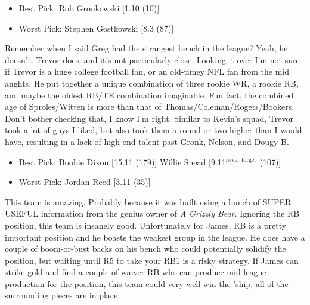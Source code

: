 \documentclass[11pt,letterpaper]{article}
\begin{document}
\begin{itemize}
\item Best Pick: Rob Gronkowski [1.10 (10)]
\item Worst Pick: Stephen Gostkowski [8.3 (87)]
\end{itemize}
Remember when I said Greg had the strangest bench in the league? Yeah, he doesn't. Trevor does, and it's not particularly close. Looking it over I'm not sure if Trevor is a huge college football fan, or an old-timey NFL fan from the mid aughts. He put together a unique combination of three rookie WR, a rookie RB, and maybe the oldest RB/TE combination imaginable. Fun fact, the combined age of Sproles/Witten is more than that of Thomas/Coleman/Rogers/Bookers. Don't bother checking that, I know I'm right. Similar to Kevin's squad, Trevor took a lot of guys I liked, but also took them a round or two higher than I would have, resulting in a lack of high end talent past Gronk, Nelson, and Dougy B.

\newpage
{}
\begin{itemize}
\item Best Pick: \sout{Boobie Dixon [15.11 (179)]} Willie Snead [9.11$^\text{never forget}$ (107)] 
\item Worst Pick: Jordan Reed [3.11 (35)]
\end{itemize}
This team is amazing. Probably because it was built using a bunch of SUPER USEFUL information from the genius owner of \textit{A Grizzly Bear}. Ignoring the RB position, this team is insanely good. Unfortunately for James, RB is a pretty important position and he boasts the weakest group in the league. He does have a couple of boom-or-bust backs on his bench who could potentially solidify the position, but waiting until R5 to take your RB1 is a risky strategy. If James can strike gold and find a couple of waiver RB who can produce mid-league production for the position, this team could very well win the 'ship, all of the surrounding pieces are in place.
\end{document}
